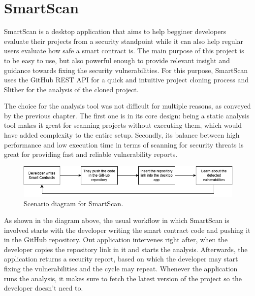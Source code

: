 \chapter{SmartScan}

SmartScan is a desktop application that aims to help begginer developers evaluate their projects from a security standpoint while it can also help regular users evaluate how safe a smart contract is. The main purpose of this project is to be easy to use, but also powerful enough to provide relevant insight and guidance towards fixing the security vulnerabilities. For this purpose, SmartScan uses the GitHub REST API \cite{gitHubRestAPI} for a quick and intuitive project cloning process and Slither \cite{slitherGitHub} for the analysis of the cloned project.

The choice for the analysis tool was not difficult for multiple reasons, as conveyed by the previous chapter. The first one is in its core design: being a static analysis tool makes it great for scanning projects without executing them, which would have added complexity to the entire setup. Secondly, its balance between high performance and low execution time in terms of scanning for security threats is great for providing fast and reliable vulnerability reports.

\begin{figure}[h]
    \centering
    \includegraphics[width=1\linewidth]{images/scenario-diagram.png}
    \caption{Scenario diagram for SmartScan.}
    \label{fig:enter-label}
\end{figure}

As shown in the diagram above, the usual workflow in which SmartScan is involved starts with the developer writing the smart contract code and pushing it in the GitHub repository. Out application intervenes right after, when the developer copies the repository link in it and starts the analysis. Afterwards, the application returns a security report, based on which the developer may start fixing the vulnerabilities and the cycle may repeat. Whenever the application runs the analysis, it makes sure to fetch the latest version of the project so the developer doesn't need to.


